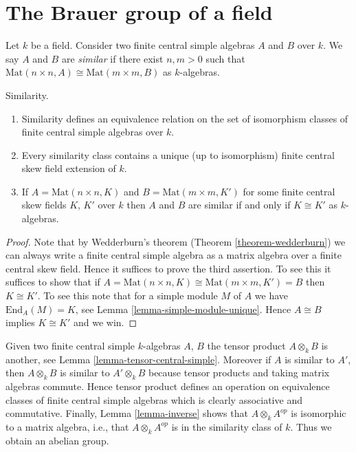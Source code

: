 \section{The Brauer group of a field}
\label{section-brauer}

\noindent
Let $k$ be a field. Consider two finite central simple algebras
$A$ and $B$ over $k$. We say $A$ and $B$ are {\it similar} if there
exist $n, m > 0$ such that
$\text{Mat}(n \times n, A) \cong \text{Mat}(m \times m, B)$
as $k$-algebras.

\begin{lemma}
\label{lemma-similar}
Similarity.
\begin{enumerate}
\item Similarity defines an equivalence relation on the set of isomorphism
classes of finite central simple algebras over $k$.
\item Every similarity class contains a unique (up to isomorphism)
finite central skew field extension of $k$.
\item If $A = \text{Mat}(n \times n, K)$ and $B = \text{Mat}(m \times m, K')$
for some finite central skew fields $K$, $K'$ over $k$
then $A$ and $B$ are similar if and only if $K \cong K'$ as $k$-algebras.
\end{enumerate}
\end{lemma}

\begin{proof}
Note that by Wedderburn's theorem (Theorem \ref{theorem-wedderburn})
we can always write a finite central simple algebra as a matrix
algebra over a finite central skew field. Hence it suffices to prove
the third assertion. To see this it suffices to show that if
$A = \text{Mat}(n \times n, K) \cong \text{Mat}(m \times m, K') = B$
then $K \cong K'$. To see this note that for a simple module $M$ of $A$
we have $\text{End}_A(M) = K$, see
Lemma \ref{lemma-simple-module-unique}.
Hence $A \cong B$ implies $K \cong K'$ and we win.
\end{proof}

\noindent
Given two finite central simple $k$-algebras $A$, $B$ the tensor
product $A \otimes_k B$ is another, see
Lemma \ref{lemma-tensor-central-simple}.
Moreover if $A$ is similar to $A'$, then $A \otimes_k B$ is similar
to $A' \otimes_k B$ because tensor products and taking matrix
algebras commute. Hence tensor product defines an operation on
equivalence classes of finite central simple algebras which is clearly
associative and commutative. Finally,
Lemma \ref{lemma-inverse}
shows that $A \otimes_k A^{op}$ is isomorphic to a matrix algebra, i.e.,
that $A \otimes_k A^{op}$ is in the similarity class of $k$.
Thus we obtain an abelian group.


